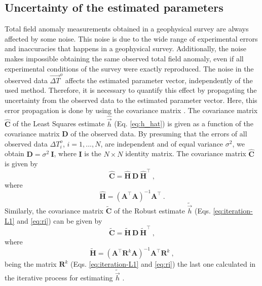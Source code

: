 \documentclass[journal abbreviation, npg]{copernicus}
\begin{document}
\subsection{Uncertainty of the estimated parameters}

Total field anomaly measurements obtained in a geophysical survey are always affected by some noise. This noise is due to the wide range of experimental errors and inaccuracies that happens in a geophysical survey. Additionally, the noise makes impossible obtaining the same observed total field anomaly, even if all experimental conditions of the survey were exactly reproduced. The noise in the observed data $\vec{\Delta T}^{o}$ affects the estimated parameter vector, independently of the used method. Therefore, it is necessary to quantify this effect by propagating the uncertainty from the observed data to the estimated parameter vector. Here, this error propagation is done by using the covariance matrix \citep{bard1973, aster-etal2005}. The covariance matrix $\hat{\mathbf{C}}$ of the Least Squares estimate $\hat{\vec{h}}$ (Eq. \ref{eq:h_hat}) is given as a function of the covariance matrix $\mathbf{D}$ of the observed data. By presuming that 
the errors of all observed data ${\Delta T}^{o}_{i}$, $i = 1, ..., N$, are independent and of equal variance $\sigma^{2}$, we obtain $\mathbf{D} = \sigma^{2} \: \mathbf{I}$, where $\mathbf{I}$ is the $N \times N$ identity matrix. The covariance matrix $\hat{\mathbf{C}}$ is given by
\begin{equation}
\hat{\mathbf{C}} = \hat{\mathbf{H}} \: \mathbf{D} \: \hat{\mathbf{H}}^{\intercal} \: ,
\label{eq:cov-h-hat}
\end{equation}
where
\begin{equation}
\hat{\mathbf{H}} = \left( \mathbf{A}^{\intercal}\mathbf{A} \right)^{-1} \mathbf{A}^{\intercal} \: .
\label{eq:H-h-hat}
\end{equation}
Similarly, the covariance matrix $\tilde{\mathbf{C}}$ of the Robust estimate $\tilde{\vec{h}}$ (Eqs. \ref{eq:iteration-L1} and \ref{eq:ri}) can be given by
\begin{equation}
\tilde{\mathbf{C}} = \tilde{\mathbf{H}} \: \mathbf{D} \: 
\tilde{\mathbf{H}}^{\intercal} \: ,
\label{eq:cov-h-tilde}
\end{equation}
where
\begin{equation}
\tilde{\mathbf{H}} = \left( \mathbf{A}^{\intercal} \mathbf{R}^{k} \mathbf{A} \right)^{-1}
\mathbf{A}^{\intercal} \mathbf{R}^{k} \: ,
\label{eq:H-h-tilde}
\end{equation}
being the matrix $\mathbf{R}^{k}$ (Eqs. \ref{eq:iteration-L1} and \ref{eq:ri}) the last one calculated in the iterative process for estimating $\tilde{\vec{h}}$ \citep{bard1973, aster-etal2005}.
\end{document}
